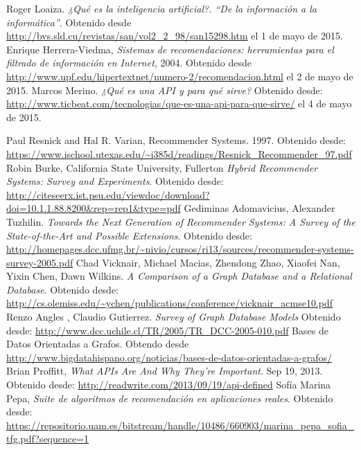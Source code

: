 \begin{thebibliography}{99}
    Roger Loaiza. \emph{¿Qué es la inteligencia artificial?. “De la información a la informática”}. Obtenido desde \url{http://bvs.sld.cu/revistas/san/vol2_2_98/san15298.htm} el 1 de mayo de 2015.
    Enrique Herrera-Viedma, \emph{Sistemas de recomendaciones: herramientas para el filtrado de información en Internet}, 2004. Obtenido desde \url{http://www.upf.edu/hipertextnet/numero-2/recomendacion.html} el 2 de mayo de 2015. 
     Marcos Merino. \emph{¿Qué es una API y para qué sirve?} Obtenido desde: \url{http://www.ticbeat.com/tecnologias/que-es-una-api-para-que-sirve/} el 4 de mayo de 2015. 

    Paul Resnick and Hal R. Varian, Recommender Systems. 1997. Obtenido desde: \url{https://www.ischool.utexas.edu/~i385d/readings/Resnick_Recommender_97.pdf}
    Robin Burke, California State University, Fullerton \emph{Hybrid Recommender Systems: Survey and Experiments}. Obtenido desde: \url{http://citeseerx.ist.psu.edu/viewdoc/download?doi=10.1.1.88.8200\&rep=rep1\&type=pdf}
    Gediminas Adomavicius, Alexander Tuzhilin. \emph{Towards the Next Generation of Recommender Systems: A Survey of the State-of-the-Art and Possible Extensions}. Obtenido desde: \url{http://homepages.dcc.ufmg.br/~nivio/cursos/ri13/sources/recommender-systems-survey-2005.pdf}
    Chad Vicknair, Michael Macias, Zhendong Zhao, Xiaofei Nan, Yixin Chen, Dawn Wilkins. \emph{A Comparison of a Graph Database and a Relational Database}. Obtenido desde: \url{http://cs.olemiss.edu/~ychen/publications/conference/vicknair_acmse10.pdf}
    Renzo Angles , Claudio Gutierrez. \emph{Survey of Graph Database Models} Obtenido desde: \url{http://www.dcc.uchile.cl/TR/2005/TR_DCC-2005-010.pdf}
    Bases de Datos Orientadas a Grafos. Obtendo desde \url{http://www.bigdatahispano.org/noticias/bases-de-datos-orientadas-a-grafos/} 
    Brian Proffitt, \emph{What APIs Are And Why They're Important}. Sep 19, 2013. Obtenido desde: \url{http://readwrite.com/2013/09/19/api-defined}
    Sofía Marina Pepa, \emph{Suite de algoritmos de recomendación en aplicaciones reales}. Obtenido desde: \url{https://repositorio.uam.es/bitstream/handle/10486/660903/marina_pepa_sofia_tfg.pdf?sequence=1}


\end{thebibliography}

